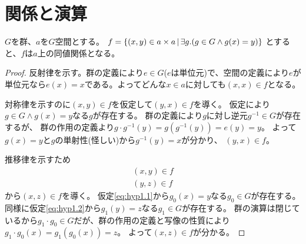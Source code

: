 \documentclass[uplatex,papersize,dvipdfmx]{jsarticle}
\begin{document}
  \section{関係と演算}
    \begin{lemma}
      $G$を群、$a$を$G$空間とする。
      $f = \{ (x, y) \in a \times a \, | \, \exists g. (g \in G \land g(x) = y) \}$
      とすると、$f$は$a$上の同値関係となる。
      \begin{proof}
        反射律を示す。群の定義により$e \in G$($e$は単位元)で、空間の定義により$e$が単位元なら$e(x) = x$である。よってどんな$x \in a$に対しても$(x, x) \in f$となる。

        対称律を示すのに$(x, y) \in f$を仮定して$(y, x) \in f$を導く。
        仮定により$g \in G \land g(x) = y$なる$g$が存在する。
        群の定義により$g$に対し逆元$g^{-1} \in G$が存在するが、
        群の作用の定義より$g \cdot g^{-1}(y) = g(g^{-1}(y)) = e(y) = y$。
        よって$g(x) = y$と$g$の単射性(怪しい)から$g^{-1}(y) = x$が分かり、
        $(y, x) \in f$。

        推移律を示すため
        \begin{align}(x, y) \in f\label{eq:hyp1.1}\\ (y, z) \in f\label{eq:hyp1.2}\end{align}から$(x, z) \in f$を導く。
        仮定\eqref{eq:hyp1.1}から$g_0(x) = y$なる$g_0 \in G$が存在する。
        同様に仮定\eqref{eq:hyp1.2}から$g_1(y) = z$なる$g_1 \in G$が存在する。
        群の演算は閉じているから$g_1 \cdot g_0 \in G$だが、群の作用の定義と写像の性質により$g_1 \cdot g_0 (x) = g_1 (g_0 (x)) = z$。
        よって$(x, z) \in f$が分かる。
      \end{proof}
    \end{lemma}
\end{document}
